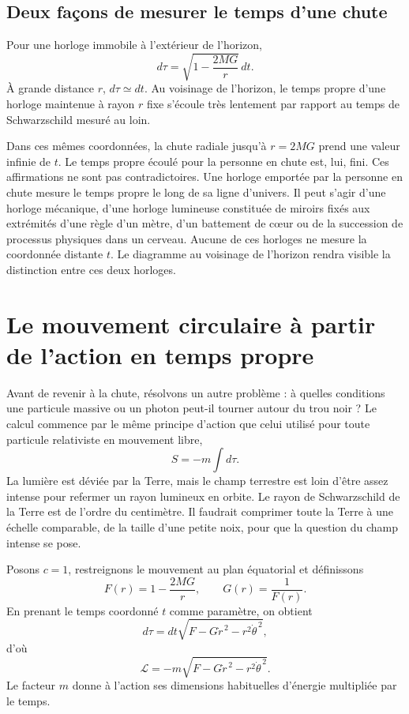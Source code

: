 \subsection{Deux façons de mesurer le temps d’une chute}

Pour une horloge immobile à l’extérieur de l’horizon,
\begin{equation}
d\tau
=
\sqrt{1-\frac{2MG}{r}}\,dt.
\label{eq:l6-static-clock}
\end{equation}
À grande distance \(r\), \(d\tau\simeq dt\). Au voisinage de l’horizon, le temps propre d’une horloge maintenue à rayon \(r\) fixe s’écoule très lentement par rapport au temps de Schwarzschild mesuré au loin.

Dans ces mêmes coordonnées, la chute radiale jusqu’à \(r=2MG\) prend une valeur infinie de \(t\). Le temps propre écoulé pour la personne en chute est, lui, fini. Ces affirmations ne sont pas contradictoires. Une horloge emportée par la personne en chute mesure le temps propre le long de sa ligne d’univers. Il peut s’agir d’une horloge mécanique, d’une horloge lumineuse constituée de miroirs fixés aux extrémités d’une règle d’un mètre, d’un battement de cœur ou de la succession de processus physiques dans un cerveau. Aucune de ces horloges ne mesure la coordonnée distante \(t\). Le diagramme au voisinage de l’horizon rendra visible la distinction entre ces deux horloges.

\section{Le mouvement circulaire à partir de l’action en temps propre}

Avant de revenir à la chute, résolvons un autre problème : à quelles conditions une particule massive ou un photon peut-il tourner autour du trou noir ? Le calcul commence par le même principe d’action que celui utilisé pour toute particule relativiste en mouvement libre,
\begin{equation}
S=-m\int d\tau.
\label{eq:l6-particle-action}
\end{equation}
La lumière est déviée par la Terre, mais le champ terrestre est loin d’être assez intense pour refermer un rayon lumineux en orbite. Le rayon de Schwarzschild de la Terre est de l’ordre du centimètre. Il faudrait comprimer toute la Terre à une échelle comparable, de la taille d’une petite noix, pour que la question du champ intense se pose.

Posons \(c=1\), restreignons le mouvement au plan équatorial et définissons
\begin{equation}
F(r)=1-\frac{2MG}{r},
\qquad
G(r)=\frac{1}{F(r)}.
\label{eq:l6-fg}
\end{equation}
En prenant le temps coordonné \(t\) comme paramètre, on obtient
\begin{equation}
d\tau
=dt\sqrt{F-G\dot r^{\,2}-r^{2}\dot\theta^{\,2}},
\end{equation}
d’où
\begin{equation}
\mathcal L
=
-m\sqrt{F-G\dot r^{\,2}-r^{2}\dot\theta^{\,2}}.
\label{eq:l6-lagrangian}
\end{equation}
Le facteur \(m\) donne à l’action ses dimensions habituelles d’énergie multipliée par le temps.

